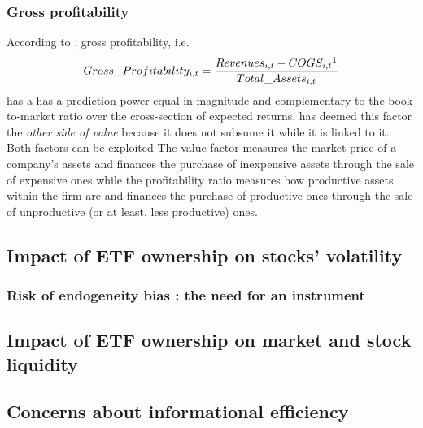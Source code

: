 \subsubsection{Gross profitability}
According to \cite{Novy-Marx2013}, gross profitability, i.e.
\begin{equation}
  Gross\_Profitability_{i, t} = \frac{Revenues_{i, t} - COGS_{i, t}\footnotemark}{Total\_Assets_{i, t}}
\end{equation}
has a has a prediction power equal in magnitude and complementary to the book-to-market ratio over the cross-section of expected returns. \cite{Novy-Marx2013} has deemed this factor the \emph{other side of value} because it does not subsume it while it is linked to it. Both factors can be exploited The value factor measures the market price of a company's assets and finances the purchase of inexpensive assets through the sale of expensive ones while the profitability ratio measures how productive assets within the firm are and finances the purchase of productive ones through the sale of unproductive (or at least, less productive) ones.
\subsection{Impact of ETF ownership on stocks' volatility}

\subsubsection{Risk of endogeneity bias : the need for an instrument}
\subsection{Impact of ETF ownership on market and stock liquidity}
\label{subsec:Method:Liquidity}
\subsection{Concerns about informational efficiency}
